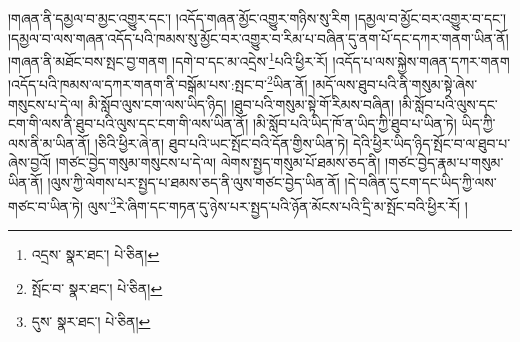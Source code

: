 །གཞན་ནི་དམྱལ་བ་མྱང་འགྱུར་དང་། །འདོད་གཞན་མྱོང་འགྱུར་གཉིས་སུ་རིག །དམྱལ་བ་མྱོང་བར་འགྱུར་བ་དང་། །དམྱལ་བ་ལས་གཞན་འདོད་པའི་ཁམས་སུ་མྱོང་བར་འགྱུར་བ་རིམ་པ་བཞིན་དུ་ནག་པོ་དང་དཀར་གནག་ཡིན་ནོ། །གཞན་ནི་མཐོང་བས་སྤང་བྱ་གནག །དགེ་བ་དང་མ་འདྲེས་\footnote{འདྲས་  སྣར་ཐང་།  པེ་ཅིན། }པའི་ཕྱིར་རོ། །འདོད་པ་ལས་སྐྱེས་གཞན་དཀར་གནག །འདོད་པའི་ཁམས་ལ་དཀར་གནག་ནི་བསྒོམ་པས་:སྤང་བ་\footnote{སྤོང་བ་  སྣར་ཐང་།  པེ་ཅིན། }ཡིན་ནོ། །མདོ་ལས་ཐུབ་པའི་ནི་གསུམ་སྟེ་ཞེས་གསུངས་པ་དེ་ལ། མི་སློབ་ལུས་ངག་ལས་ཡིད་ཉིད། །ཐུབ་པའི་གསུམ་སྟེ་གོ་རིམས་བཞིན། །མི་སློབ་པའི་ལུས་དང་ངག་གི་ལས་ནི་ཐུབ་པའི་ལུས་དང་ངག་གི་ལས་ཡིན་ནོ། །མི་སློབ་པའི་ཡིད་ཁོ་ན་ཡིད་ཀྱི་ཐུབ་པ་ཡིན་ཏེ། ཡིད་ཀྱི་ལས་ནི་མ་ཡིན་ནོ། །ཅིའི་ཕྱིར་ཞེ་ན། ཐུབ་པའི་ཡང་སྤོང་བའི་དོན་གྱིས་ཡིན་ཏེ། དེའི་ཕྱིར་ཡིད་ཉིད་སྤོང་བ་ལ་ཐུབ་པ་ཞེས་བྱའོ། །གཙང་བྱེད་གསུམ་གསུངས་པ་དེ་ལ། ལེགས་སྤྱད་གསུམ་པོ་ཐམས་ཅད་ནི། །གཙང་བྱེད་རྣམ་པ་གསུམ་ཡིན་ནོ། །ལུས་ཀྱི་ལེགས་པར་སྤྱད་པ་ཐམས་ཅད་ནི་ལུས་གཙང་བྱེད་ཡིན་ནོ། །དེ་བཞིན་དུ་ངག་དང་ཡིད་ཀྱི་ལས་གཙང་བ་ཡིན་ཏེ། ལུས་\footnote{དུས་  སྣར་ཐང་།  པེ་ཅིན། }རེ་ཞིག་དང་གཏན་དུ་ཉེས་པར་སྤྱད་པའི་ཉོན་མོངས་པའི་དྲི་མ་སྤོང་བའི་ཕྱིར་རོ། །
